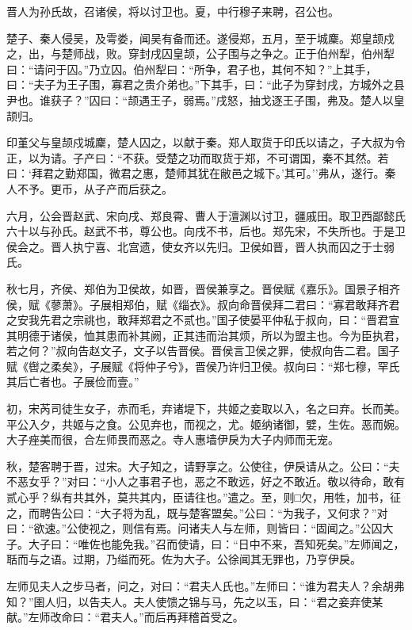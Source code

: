 \documentclass[]{article}
\begin{document}
晋人为孙氏故，召诸侯，将以讨卫也。夏，中行穆子来聘，召公也。

楚子、秦人侵吴，及雩娄，闻吴有备而还。遂侵郑，五月，至于城麇。郑皇颉戍之，出，与楚师战，败。穿封戌囚皇颉，公子围与之争之。正于伯州犁，伯州犁曰：``请问于囚。''乃立囚。伯州犁曰：``所争，君子也，其何不知？''上其手，曰：``夫子为王子围，寡君之贵介弟也。''下其手，曰：``此子为穿封戌，方城外之县尹也。谁获子？''囚曰：``颉遇王子，弱焉。''戌怒，抽戈逐王子围，弗及。楚人以皇颉归。

印堇父与皇颉戍城麇，楚人囚之，以献于秦。郑人取货于印氏以请之，子大叔为令正，以为请。子产曰：``不获。受楚之功而取货于郑，不可谓国，秦不其然。若曰：`拜君之勤郑国，微君之惠，楚师其犹在敝邑之城下。'其可。''弗从，遂行。秦人不予。更币，从子产而后获之。

六月，公会晋赵武、宋向戌、郑良霄、曹人于澶渊以讨卫，疆戚田。取卫西鄙懿氏六十以与孙氏。赵武不书，尊公也。向戌不书，后也。郑先宋，不失所也。于是卫侯会之。晋人执宁喜、北宫遗，使女齐以先归。卫侯如晋，晋人执而囚之于士弱氏。

秋七月，齐侯、郑伯为卫侯故，如晋，晋侯兼享之。晋侯赋《嘉乐》。国景子相齐侯，赋《蓼萧》。子展相郑伯，赋《缁衣》。叔向命晋侯拜二君曰：``寡君敢拜齐君之安我先君之宗祧也，敢拜郑君之不贰也。''国子使晏平仲私于叔向，曰：``晋君宣其明德于诸侯，恤其患而补其阙，正其违而治其烦，所以为盟主也。今为臣执君，若之何？''叔向告赵文子，文子以告晋侯。晋侯言卫侯之罪，使叔向告二君。国子赋《辔之柔矣》，子展赋《将仲子兮》，晋侯乃许归卫侯。叔向曰：``郑七穆，罕氏其后亡者也。子展俭而壹。''

初，宋芮司徒生女子，赤而毛，弃诸堤下，共姬之妾取以入，名之曰弃。长而美。平公入夕，共姬与之食。公见弃也，而视之，尤。姬纳诸御，嬖，生佐。恶而婉。大子痤美而很，合左师畏而恶之。寺人惠墙伊戾为大子内师而无宠。

秋，楚客聘于晋，过宋。大子知之，请野享之。公使往，伊戾请从之。公曰：``夫不恶女乎？''对曰：``小人之事君子也，恶之不敢远，好之不敢近。敬以待命，敢有贰心乎？纵有共其外，莫共其内，臣请往也。''遣之。至，则□欠，用牲，加书，征之，而聘告公曰：``大子将为乱，既与楚客盟矣。''公曰：``为我子，又何求？''对曰：``欲速。''公使视之，则信有焉。问诸夫人与左师，则皆曰：``固闻之。''公囚大子。大子曰：``唯佐也能免我。''召而使请，曰：``日中不来，吾知死矣。''左师闻之，聒而与之语。过期，乃缢而死。佐为大子。公徐闻其无罪也，乃亨伊戾。

左师见夫人之步马者，问之，对曰：``君夫人氏也。''左师曰：``谁为君夫人？余胡弗知？''圉人归，以告夫人。夫人使馈之锦与马，先之以玉，曰：``君之妾弃使某献。''左师改命曰：``君夫人。''而后再拜稽首受之。
\end{document}
